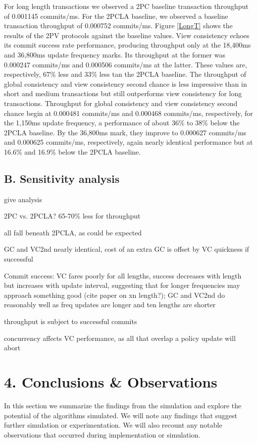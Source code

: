 \documentclass[11pt]{article}
\begin{document}
For long length transactions we observed a 2PC baseline transaction throughput of 0.001145 commits/ms. For the 2PCLA baseline, we observed a baseline transaction throughput of 0.000752 commits/ms. Figure \ref{LongT} shows the results of the 2PV protocols against the baseline values. View consistency echoes its commit success rate performance, producing throughput only at the 18,400ms and 36,800ms update frequency marks. Its throughput at the former was 0.000247 commits/ms and 0.000506 commits/ms at the latter. These values are, respectively, 67\% less and 33\% less tan the 2PCLA baseline. The throughput of global consistency and view consistency second chance is less impressive than in short and medium transactions but still outperforms view consistency for long transactions. Throughput for global consistency and view consistency second chance begin at 0.000481 commits/ms and 0.000468 commits/ms, respectively, for the 1,150ms update frequency, a performance of about 36\% to 38\% below the 2PCLA baseline. By the 36,800ms mark, they improve to 0.000627 commits/ms and 0.000625 commits/ms, respectively, again nearly identical performance but at 16.6\% and 16.9\% below the 2PCLA baseline.
\subsection{B. Sensitivity analysis}
give analysis

2PC vs. 2PCLA? 65-70\% less for throughput

all fall beneath 2PCLA, as could be expected

GC and VC2nd nearly identical, cost of an extra GC is offset by VC quickness if successful

Commit success: VC fares poorly for all lengths, success decreases with length but increases with update interval, suggesting that for longer frequencies may approach something good (cite paper on xn length?); GC and VC2nd do reasonably well as freq updates are longer and ten lengths are shorter

throughput is subject to successful commits

concurrency affects VC performance, as all that overlap a policy update will abort

\section{4. Conclusions \& Observations}
In this section we summarize the findings from the simulation and explore the potential of the algorithms simulated. We will note any findings that suggest further simulation or experimentation. We will also recount any notable observations that occurred during implementation or simulation.
\end{document}
